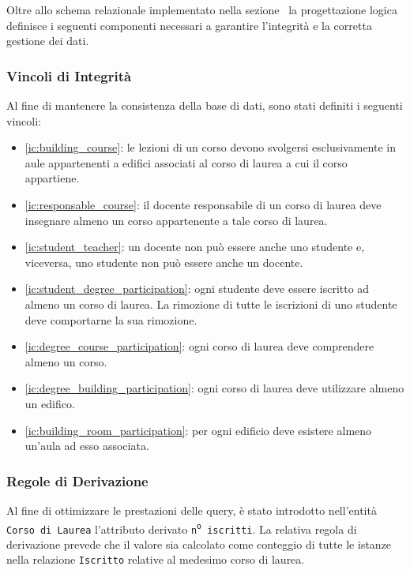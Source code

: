 \documentclass[a4paper,11pt]{article}
\begin{document}
Oltre allo schema relazionale implementato nella sezione~ la progettazione logica definisce i seguenti componenti necessari a garantire l'integrità e la corretta gestione dei dati.


\subsubsection{Vincoli di Integrità}

Al fine di mantenere la consistenza della base di dati, sono stati definiti i seguenti vincoli:

\begin{itemize}
    \item \ref{ic:building_course}: le lezioni di un corso devono svolgersi esclusivamente in aule appartenenti a edifici associati al corso di laurea a cui il corso appartiene.
    \item \ref{ic:responsable_course}: il docente responsabile di un corso di laurea deve insegnare almeno un corso appartenente a tale corso di laurea.
    \item \ref{ic:student_teacher}: un docente non può essere anche uno studente e, viceversa, uno studente non può essere anche un docente.
    \item \ref{ic:student_degree_participation}: ogni studente deve essere iscritto ad almeno un corso di laurea. La rimozione di tutte le iscrizioni di uno studente deve comportarne la sua rimozione.
    \item \ref{ic:degree_course_participation}: ogni corso di laurea deve comprendere almeno un corso.
    \item \ref{ic:degree_building_participation}: ogni corso di laurea deve utilizzare almeno un edifico.
    \item \ref{ic:building_room_participation}: per ogni edificio deve esistere almeno un'aula ad esso associata.
\end{itemize}


\subsubsection{Regole di Derivazione}

Al fine di ottimizzare le prestazioni delle query, è stato introdotto nell'entità \texttt{Corso di Laurea} l'attributo derivato \texttt{n\textsuperscript{o} iscritti}. La relativa regola di derivazione prevede che il valore sia calcolato come conteggio di tutte le istanze nella relazione \texttt{Iscritto} relative al medesimo corso di laurea.
\end{document}
